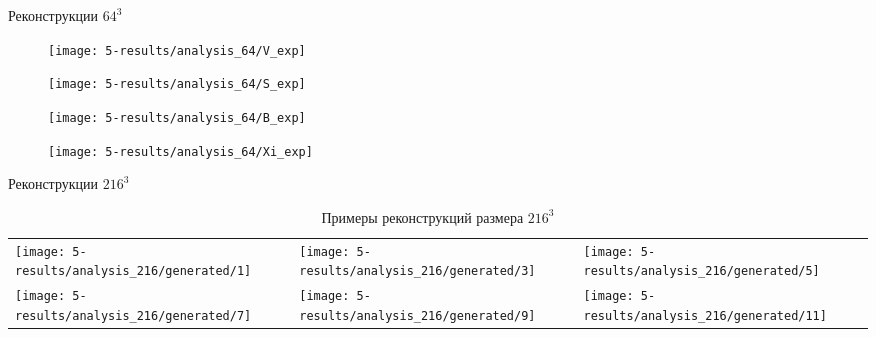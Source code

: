 \documentclass[12pt]{beamer}
\begin{document}
	\begin{frame}{Реконструкции $64^3$}
		\begin{figure}
			\begin{minipage}{0.45\linewidth}
				\centering
				\texttt{[image: 5-results/analysis\_64/V\_exp]}
			\end{minipage}
			\hfill
			\begin{minipage}[h]{0.45\linewidth}
				\centering
				\texttt{[image: 5-results/analysis\_64/S\_exp]}
			\end{minipage}
			\vfill
			\begin{minipage}[h]{0.45\linewidth}
				\centering
				\texttt{[image: 5-results/analysis\_64/B\_exp]}
			\end{minipage}
			\hfill
			\begin{minipage}[h]{0.45\linewidth}
				\centering
				\texttt{[image: 5-results/analysis\_64/Xi\_exp]}
			\end{minipage}
		\end{figure}
	\end{frame}

	\begin{frame}{Реконструкции $216^3$}
		\begin{table}
			\centering
			\begin{tabular}{p{3cm} p{3cm} p{3cm}}
				\texttt{[image: 5-results/analysis\_216/generated/1]}
				&
				\texttt{[image: 5-results/analysis\_216/generated/3]}
				&
				\texttt{[image: 5-results/analysis\_216/generated/5]}
				\\
				\texttt{[image: 5-results/analysis\_216/generated/7]}
				&
				\texttt{[image: 5-results/analysis\_216/generated/9]}
				&
				\texttt{[image: 5-results/analysis\_216/generated/11]}
			\end{tabular}
			\caption{Примеры реконструкций размера $216^3$}
		\end{table}
	\end{frame}
\end{document}
